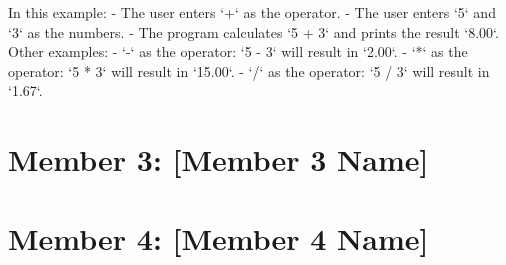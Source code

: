 \documentclass[a4paper,12pt]{article}
\begin{document}
In this example:
- The user enters `+` as the operator.
- The user enters `5` and `3` as the numbers.
- The program calculates `5 + 3` and prints the result `8.00`.\\

Other examples:
- `-` as the operator: `5 - 3` will result in `2.00`.
- `*` as the operator: `5 * 3` will result in `15.00`.
- `/` as the operator: `5 / 3` will result in `1.67`.

\newpage

\section*{Member 3: [Member 3 Name]}
\date{\today}
\newpage

\section*{Member 4: [Member 4 Name]}
\date{\today}
\end{document}
